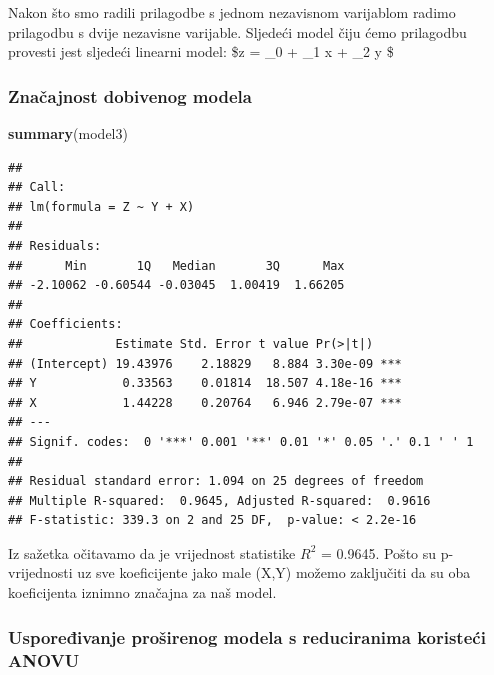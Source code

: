 \documentclass[]{article}
\newenvironment{Shaded}{\begin{snugshade}}{\end{snugshade}}
\newcommand{\KeywordTok}[1]{\textcolor[rgb]{0.13,0.29,0.53}{\textbf{{#1}}}}
\newcommand{\StringTok}[1]{\textcolor[rgb]{0.31,0.60,0.02}{{#1}}}
\newcommand{\NormalTok}[1]{{#1}}
\begin{document}
Nakon što smo radili prilagodbe s jednom nezavisnom varijablom radimo
prilagodbu s dvije nezavisne varijable. Sljedeći model čiju ćemo
prilagodbu provesti jest sljedeći linearni model: \$z = \theta\_0 +
\theta\_1 x + \theta\_2 y \$

\begin{Shaded}
\end{Shaded}

\subsubsection{Značajnost dobivenog
modela}\label{znacajnost-dobivenog-modela}

\begin{Shaded}
\begin{Highlighting}[]
\KeywordTok{summary}\NormalTok{(model3)}
\end{Highlighting}
\end{Shaded}

\begin{verbatim}
## 
## Call:
## lm(formula = Z ~ Y + X)
## 
## Residuals:
##      Min       1Q   Median       3Q      Max 
## -2.10062 -0.60544 -0.03045  1.00419  1.66205 
## 
## Coefficients:
##             Estimate Std. Error t value Pr(>|t|)    
## (Intercept) 19.43976    2.18829   8.884 3.30e-09 ***
## Y            0.33563    0.01814  18.507 4.18e-16 ***
## X            1.44228    0.20764   6.946 2.79e-07 ***
## ---
## Signif. codes:  0 '***' 0.001 '**' 0.01 '*' 0.05 '.' 0.1 ' ' 1
## 
## Residual standard error: 1.094 on 25 degrees of freedom
## Multiple R-squared:  0.9645, Adjusted R-squared:  0.9616 
## F-statistic: 339.3 on 2 and 25 DF,  p-value: < 2.2e-16
\end{verbatim}

Iz sažetka očitavamo da je vrijednost statistike \(R^2\) = 0.9645. Pošto
su p-vrijednosti uz sve koeficijente jako male (X,Y) možemo zaključiti
da su oba koeficijenta iznimno značajna za naš model.

\subsubsection{Uspoređivanje proširenog modela s reduciranima koristeći
ANOVU}\label{usporeivanje-prosirenog-modela-s-reduciranima-koristeci-anovu}
\end{document}
